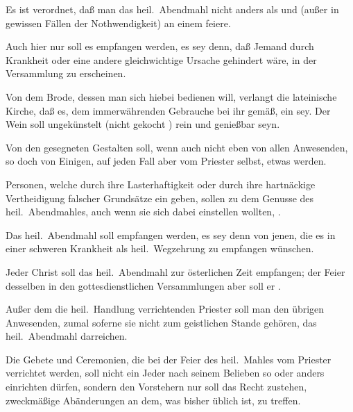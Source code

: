 \begin{aufza}
\begin{aufzb}
\item Es ist verordnet, daß man das heil.\ Abendmahl nicht anders als  und (außer in gewissen Fällen der Nothwendigkeit) an einem  feiere.
\item Auch hier nur soll es empfangen werden, es sey denn, daß Jemand durch Krankheit oder eine andere gleichwichtige Ursache gehindert wäre, in der Versammlung zu erscheinen.
\item Von dem Brode, dessen man sich hiebei bedienen will, verlangt die lateinische Kirche, daß es, dem immerwährenden Gebrauche bei ihr gemäß, ein  sey. Der Wein soll ungekünstelt (nicht gekocht \udgl ) rein und genießbar seyn.
\item Von den gesegneten Gestalten soll, wenn auch nicht eben von allen Anwesenden, so doch von Einigen, auf jeden Fall aber vom Priester selbst, etwas  werden.
\item Personen, welche durch ihre Lasterhaftigkeit oder durch ihre hartnäckige Vertheidigung falscher Grundsätze ein  geben, sollen zu dem Genusse des heil.\ Abendmahles, auch wenn sie sich dabei einstellen wollten, .
\item Das heil.\ Abendmahl soll  empfangen werden, es sey denn von jenen, die es in einer schweren Krankheit als heil.\ Wegzehrung zu empfangen wünschen.
\item Jeder Christ soll das heil.\ Abendmahl  zur österlichen Zeit empfangen; der Feier desselben in den gottesdienstlichen Versammlungen aber soll er .
\item Außer dem die heil.\ Handlung verrichtenden Priester soll man den übrigen Anwesenden, zumal soferne sie nicht zum geistlichen Stande gehören, das heil.\ Abendmahl  darreichen.
\item Die Gebete und Ceremonien, die bei der Feier des heil.\ Mahles vom Priester verrichtet werden, soll nicht ein Jeder nach seinem Belieben so oder anders einrichten dürfen, sondern den Vorstehern nur soll das Recht zustehen, zweckmäßige Abänderungen an dem, was bisher üblich ist, zu treffen.
\end{aufzb}
\end{aufza}

